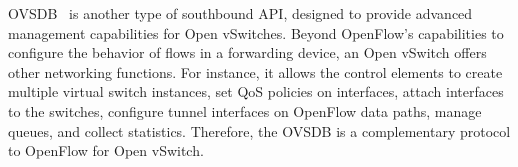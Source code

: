 
OVSDB~\cite{pfaff2013-1} is another type of southbound API, designed to provide 
advanced management capabilities for Open vSwitches. Beyond OpenFlow's capabilities to configure 
the behavior of flows in a forwarding device, an Open vSwitch offers other networking functions.
For instance, it allows the control elements to create multiple virtual switch instances, set QoS 
policies on interfaces, attach interfaces to the switches, configure tunnel interfaces on OpenFlow 
data paths, manage queues, and collect statistics.
Therefore, the OVSDB is a complementary protocol to OpenFlow for Open vSwitch. 


%

